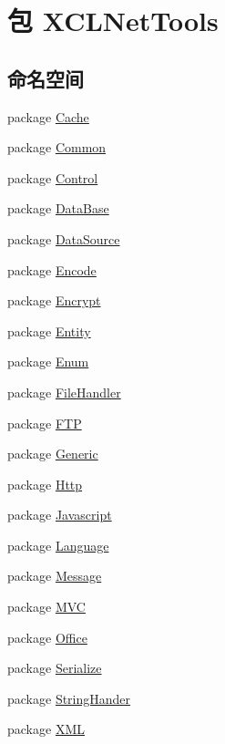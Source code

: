 \hypertarget{namespace_x_c_l_net_tools}{\section{包 X\-C\-L\-Net\-Tools}
\label{namespace_x_c_l_net_tools}
}
\subsection*{命名空间}
\begin{DoxyCompactItemize}
\item 
package \hyperlink{namespace_x_c_l_net_tools_1_1_cache}{Cache}
\item 
package \hyperlink{namespace_x_c_l_net_tools_1_1_common}{Common}
\item 
package \hyperlink{namespace_x_c_l_net_tools_1_1_control}{Control}
\item 
package \hyperlink{namespace_x_c_l_net_tools_1_1_data_base}{Data\-Base}
\item 
package \hyperlink{namespace_x_c_l_net_tools_1_1_data_source}{Data\-Source}
\item 
package \hyperlink{namespace_x_c_l_net_tools_1_1_encode}{Encode}
\item 
package \hyperlink{namespace_x_c_l_net_tools_1_1_encrypt}{Encrypt}
\item 
package \hyperlink{namespace_x_c_l_net_tools_1_1_entity}{Entity}
\item 
package \hyperlink{namespace_x_c_l_net_tools_1_1_enum}{Enum}
\item 
package \hyperlink{namespace_x_c_l_net_tools_1_1_file_handler}{File\-Handler}
\item 
package \hyperlink{namespace_x_c_l_net_tools_1_1_f_t_p}{F\-T\-P}
\item 
package \hyperlink{namespace_x_c_l_net_tools_1_1_generic}{Generic}
\item 
package \hyperlink{namespace_x_c_l_net_tools_1_1_http}{Http}
\item 
package \hyperlink{namespace_x_c_l_net_tools_1_1_javascript}{Javascript}
\item 
package \hyperlink{namespace_x_c_l_net_tools_1_1_language}{Language}
\item 
package \hyperlink{namespace_x_c_l_net_tools_1_1_message}{Message}
\item 
package \hyperlink{namespace_x_c_l_net_tools_1_1_m_v_c}{M\-V\-C}
\item 
package \hyperlink{namespace_x_c_l_net_tools_1_1_office}{Office}
\item 
package \hyperlink{namespace_x_c_l_net_tools_1_1_serialize}{Serialize}
\item 
package \hyperlink{namespace_x_c_l_net_tools_1_1_string_hander}{String\-Hander}
\item 
package \hyperlink{namespace_x_c_l_net_tools_1_1_x_m_l}{X\-M\-L}
\end{DoxyCompactItemize}
